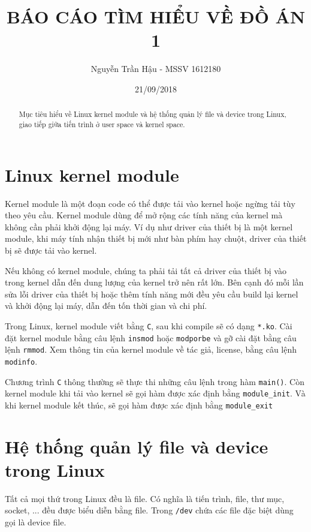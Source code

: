 \documentclass[12pt]{article}
\begin{document}
\title{BÁO CÁO TÌM HIỂU VỀ ĐỒ ÁN 1}
\author{Nguyễn Trần Hậu - MSSV 1612180}
\date{21/09/2018}
\maketitle

\begin{abstract}
Mục tiêu hiểu về Linux kernel module và hệ thống quản lý file và device trong Linux, giao tiếp giữa tiến trình ở user space và kernel space.
\end{abstract}

\section{Linux kernel module}

Kernel module là một đoạn code có thể được tải vào kernel hoặc ngừng tải tùy theo yêu cầu. Kernel module dùng để mở rộng các tính năng của kernel mà không cần phải khởi động lại máy. Ví dụ như driver của thiết bị là một kernel module, khi máy tính nhận thiết bị mới như bàn phím hay chuột, driver của thiết bị sẽ được tải vào kernel.  

Nếu không có kernel module, chúng ta phải tải tất cả driver của thiết bị vào trong kernel dẫn đến dung lượng của kernel trở nên rất lớn. Bên cạnh đó mỗi lần sửa lỗi driver của thiết bị hoặc thêm tính năng mới đều yêu cầu build lại kernel và khởi động lại máy, dẫn đến tốn thời gian và chi phí. 

Trong Linux, kernel module viết bằng \texttt{C}, sau khi compile sẽ có dạng \texttt{*.ko}. Cài đặt kernel module bằng câu lệnh \texttt{insmod} hoặc \texttt{modporbe} và gỡ cài đặt bằng câu lệnh \texttt{rmmod}. Xem thông tin của kernel module về tác giả, license,  bằng câu lệnh \texttt{modinfo}.

Chương trình \texttt{C} thông thường sẽ thực thi những câu lệnh trong hàm \texttt{main()}. Còn kernel module khi tải vào kernel sẽ gọi hàm được xác định bằng \texttt{module\_init}. Và khi kernel module kết thúc, sẽ gọi hàm được xác định bằng \texttt{module\_exit}
 
\section{Hệ thống quản lý file và device trong Linux}
 
Tất cả mọi thứ trong Linux đều là file\cite{file}. Có nghĩa là tiến trình, file, thư mục, socket, ... đều được biểu diễn bằng file. Trong \texttt{/dev} chứa các file đặc biệt dùng gọi là device file. 
\end{document}
